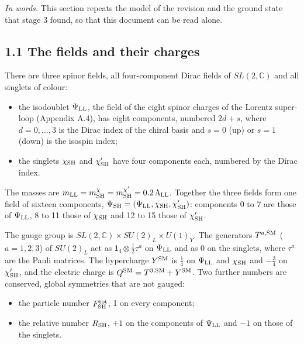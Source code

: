 \documentclass[
  10pt,
]{article}
\providecommand{\tightlist}{%
  \setlength{\itemsep}{0pt}\setlength{\parskip}{0pt}}
\begin{document}
\emph{In words.} This section repeats the model of the revision and the
ground state that stage 3 found, so that this document can be read
alone.

\hypertarget{the-fields-and-their-charges}{%
\subsection{1.1 The fields and their
charges}\label{the-fields-and-their-charges}}

There are three spinor fields, all four-component Dirac fields of
\(SL(2,\mathbb C)\) and all singlets of colour:

\begin{itemize}
\tightlist
\item
  the isodoublet \(\Psi_{\rm LL}\), the field of the eight spinor
  charges of the Lorentz super-loop (Appendix A.4), has eight
  components, numbered \(2d+s\), where \(d=0,\dots,3\) is the Dirac
  index of the chiral basis and \(s=0\) (up) or \(s=1\) (down) is the
  isospin index;
\item
  the singlets \(\chi_{\rm SH}\) and \(\chi'_{\rm SH}\) have four
  components each, numbered by the Dirac index.
\end{itemize}

The masses are
\(m_{\rm LL}=m^\chi_{\rm SH}=m^{\chi'}_{\rm SH}=0.2\,\Lambda_{\rm LL}\).
Together the three fields form one field of sixteen components,
\(\Psi_{\rm SH}=(\Psi_{\rm LL},\chi_{\rm SH},\chi'_{\rm SH})\):
components 0 to 7 are those of \(\Psi_{\rm LL}\), 8 to 11 those of
\(\chi_{\rm SH}\) and 12 to 15 those of \(\chi'_{\rm SH}\).

The gauge group is \(SL(2,\mathbb C)\times SU(2)_L\times U(1)_Y\). The
generators \(T^{a,{\rm SM}}\) (\(a=1,2,3\)) of \(SU(2)_L\) act as
\(\mathsf 1_4\otimes\tfrac12\tau^a\) on \(\Psi_{\rm LL}\) and as 0 on
the singlets, where \(\tau^a\) are the Pauli matrices. The hypercharge
\(Y^{\rm SM}\) is \(\tfrac14\) on \(\Psi_{\rm LL}\) and
\(\chi_{\rm SH}\) and \(-\tfrac34\) on \(\chi'_{\rm SH}\), and the
electric charge is \(Q^{\rm SM}=T^{3,{\rm SM}}+Y^{\rm SM}\). Two further
numbers are conserved, global symmetries that are not gauged:

\begin{itemize}
\tightlist
\item
  the particle number \(F^{\rm tot}_{\rm SH}\), 1 on every component;
\item
  the relative number \(R_{\rm SH}\), \(+1\) on the components of
  \(\Psi_{\rm LL}\) and \(-1\) on those of the singlets.
\end{itemize}
\end{document}
